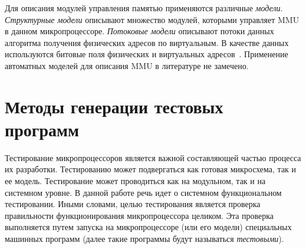 %
%
%
%
%
%
%
%
%
%
%
%


Для описания модулей управления памятью применяются различные
\emph{модели}. \emph{Структурные модели} описывают множество
модулей, которыми управляет MMU в данном микропроцессоре.
\emph{Потоковые модели} описывают потоки данных алгоритма получения
физических адресов по виртуальным. В качестве данных используются
битовые поля физических и виртуальных
адресов~\cite{FundamentalOfComputerOrganizationAndDesign}. %
Применение автоматных моделей для описания MMU в литературе не
замечено.



\section{Методы генерации тестовых программ}

Тестирование микропроцессоров является важной составляющей частью
процесса их разработки. Тестированию может подвергаться как готовая
микросхема, так и ее модель. Тестирование может проводиться как на
модульном, так и на системном уровне. В данной работе речь идет о
системном функциональном тестировании. Иными словами, целью
тестирования является проверка правильности функционирования
микропроцессора целиком. Эта проверка выполняется путем запуска на
микропроцессоре (или его модели) специальных машинных программ
(далее такие программы будут называться \emph{тестовыми}).

